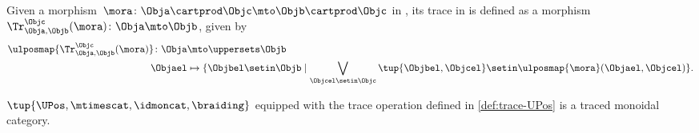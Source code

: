 \begin{definition}
    \label{def:trace-UPos}
    Given a morphism~$\mora\colon \Obja \cartprod \Objc \mto \Objb\cartprod \Objc$ in \UPos, its trace in is defined as a morphism~$\Tr_{\Obja,\Objb}^{\Objc}(\mora)\colon \Obja \mto \Objb$, given by
    \begin{equation}
        \begin{aligned}
            \ulposmap{\Tr_{\Obja,\Objb}^{\Objc}(\mora)}\colon \Obja & \mto \uppersets \Objb \\
            \Objael                                                 & \mapsto \{\Objbel \setin \Objb \mid \bigvee_{\Objcel \setin \Objc}\tup{\Objbel, \Objcel}\setin \ulposmap{\mora}(\Objael,\Objcel)\}.
        \end{aligned}
    \end{equation}
\end{definition}
\begin{lemma}
    \label{lem:UPos-is-traced}
    $\tup{\UPos,\mtimescat, \idmoncat,\braiding}$ equipped with the trace operation defined in \cref{def:trace-UPos} is a traced monoidal category.
\end{lemma}
